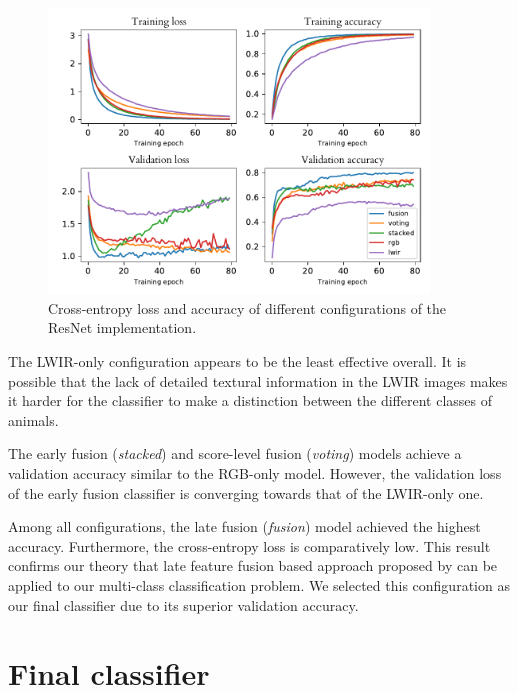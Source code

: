 \documentclass{l4proj}
\begin{document}
\begin{figure}[ht]
  \centering
  \includegraphics[width=0.9\textwidth]{images/evaluation/gridsearch/ResNet}
  \caption{Cross-entropy loss and accuracy of different configurations of the ResNet implementation.}
  \label{fig:resnet_configs}
\end{figure}

The LWIR-only configuration appears to be the least effective overall. It is possible that the lack of detailed textural information in the LWIR images makes it harder for the classifier to make a distinction between the different classes of animals.

The early fusion (\textit{stacked}) and score-level fusion (\textit{voting}) models achieve a validation accuracy similar to the RGB-only model. However, the validation loss of the early fusion classifier is converging towards that of the LWIR-only one.

Among all configurations, the late fusion (\textit{fusion}) model achieved the highest accuracy. Furthermore, the cross-entropy loss is comparatively low. This result confirms our theory that late feature fusion based approach proposed by \citet{wagner_multispectral_2016} can be applied to our multi-class classification problem. We selected this configuration as our final classifier due to its superior validation accuracy. 


\section{Final classifier}
\label{eval_final}
\end{document}

